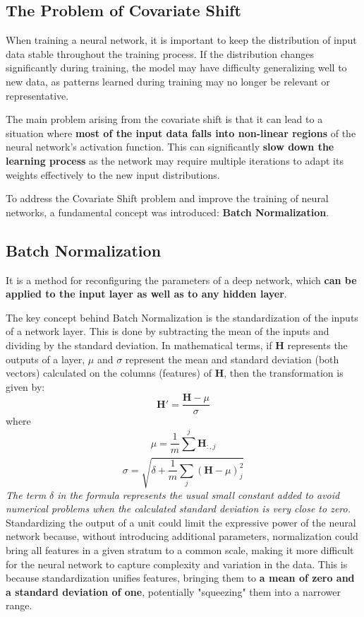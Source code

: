 \subsection{The Problem of Covariate Shift}

When training a neural network, it is important to keep the distribution of input data stable throughout the training process. If the distribution changes significantly during training, the model may have difficulty generalizing well to new data, as patterns learned during training may no longer be relevant or representative.

The main problem arising from the covariate shift is that it can lead to a situation where \textbf{most of the input data falls into non-linear regions} of the neural network's activation function. This can significantly \textbf{slow down the learning process} as the network may require multiple iterations to adapt its weights effectively to the new input distributions.

To address the Covariate Shift problem and improve the training of neural networks, a fundamental concept was introduced: \textbf{Batch Normalization}.

\subsection{Batch Normalization}

It is a method for reconfiguring the parameters of a deep network, which \textbf{can be applied to the input layer as well as to any hidden layer}.

The key concept behind Batch Normalization is the standardization of the inputs of a network layer. This is done by subtracting the mean of the inputs and dividing by the standard deviation. In mathematical terms, if $ \mathbf{H} $ represents the outputs of a layer, $ \mu $ and $ \sigma $ represent the mean and standard deviation (both vectors) calculated on the columns (features) of $ \mathbf{H} $, then the transformation is given by:
$$ \mathbf{H}' = \frac{\mathbf{H} - \mu}{\sigma} $$ where $$\mu = \frac{1}{m}\sum_{}^{j}\mathbf{H}_{:,j}$$
$$\sigma = \sqrt{\delta + \frac{1}{m}\sum_{j}^{}(\mathbf{H}-\mu)^2_j}$$
\textit{The term $\delta$ in the formula represents the usual small constant added to avoid numerical problems when the calculated standard deviation is very close to zero. }
Standardizing the output of a unit could limit the expressive power of the neural network because, without introducing additional parameters, normalization could bring all features in a given stratum to a common scale, making it more difficult for the neural network to capture complexity and variation in the data. This is because standardization unifies features, bringing them to \textbf{a mean of zero and a standard deviation of one}, potentially "squeezing" them into a narrower range.

